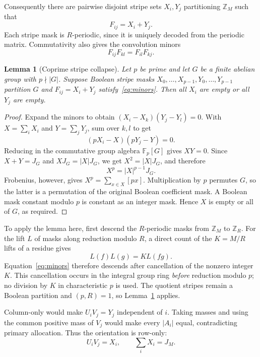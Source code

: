 \documentclass[11pt]{article}
\newtheorem{lemma}[theorem]{Lemma}
\newcommand{\Z}{\mathbb Z}
\newcommand{\F}{\mathbb F}
\begin{document}
Consequently there are pairwise disjoint stripe sets $X_i,Y_j$ partitioning $\Z_M$ such that
\begin{equation}\label{eq:stripes}
 F_{ij}=X_i+Y_j.
\end{equation}
Each stripe mask is $R$-periodic, since it is uniquely decoded from the periodic matrix. Commutativity also gives the convolution minors
\begin{equation}\label{eq:minors}
 F_{ij}F_{kl}=F_{il}F_{kj}.
\end{equation}

\begin{lemma}[Coprime stripe collapse]\label{lem:collapse}
Let $p$ be prime and let $G$ be a finite abelian group with $p\nmid|G|$. Suppose Boolean stripe masks $X_0,\ldots,X_{p-1},Y_0,\ldots,Y_{p-1}$ partition $G$ and $F_{ij}=X_i+Y_j$ satisfy~\eqref{eq:minors}. Then all $X_i$ are empty or all $Y_j$ are empty.
\end{lemma}
\begin{proof}
Expand the minors to obtain $(X_i-X_k)(Y_j-Y_l)=0$. With $X=\sum_iX_i$ and $Y=\sum_jY_j$, sum over $k,l$ to get
\[
 (pX_i-X)(pY_j-Y)=0.
\]
Reducing in the commutative group algebra $\F_p[G]$ gives $XY=0$. Since $X+Y=J_G$ and $XJ_G=|X|J_G$, we get $X^2=|X|J_G$, and therefore
\[
 X^p=|X|^{p-1}J_G.
\]
Frobenius, however, gives $X^p=\sum_{x\in X}[px]$. Multiplication by $p$ permutes $G$, so the latter is a permutation of the original Boolean coefficient mask. A Boolean mask constant modulo $p$ is constant as an integer mask. Hence $X$ is empty or all of $G$, as required.
\end{proof}

To apply the lemma here, first descend the $R$-periodic masks from $\Z_M$ to $\Z_R$. For the lift $L$ of masks along reduction modulo $R$, a direct count of the $K=M/R$ lifts of a residue gives
\begin{equation}\label{eq:lift}
 L(f)L(g)=K L(fg).
\end{equation}
Equation~\eqref{eq:minors} therefore descends after cancellation of the nonzero integer $K$. This cancellation occurs in the integral group ring \emph{before} reduction modulo $p$; no division by $K$ in characteristic $p$ is used. The quotient stripes remain a Boolean partition and $(p,R)=1$, so Lemma~\ref{lem:collapse} applies.

Column-only would make $U_iV_j=Y_j$ independent of $i$. Taking masses and using the common positive mass of $V_j$ would make every $|A_i|$ equal, contradicting primary allocation. Thus the orientation is row-only:
\begin{equation}\label{eq:rowonly}
 U_iV_j=X_i,\qquad \sum_iX_i=J_M.
\end{equation}
\end{document}
